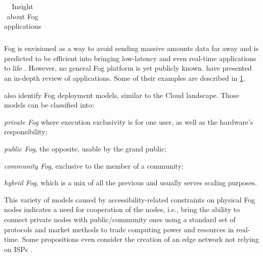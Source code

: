 \documentclass[11pt]{sdm}
\begin{document}
\begin{table}[t]
\begin{tabular}{@{} p{3cm}|p{12cm} @{}}
		\\
		\cmidrule[1pt]{1-2}
	\end{tabular}
	\caption{\label{tab:applications}Insight about Fog applications \cite{ahmed_fog_2019}}
\end{table}

Fog is envisioned as a way to avoid sending massive amounts data far away and is predicted to be efficient into bringing low-latency and even real-time applications to life \cite{ahmed_fog_2019}. However, no general Fog platform is yet publicly known. \citet{ahmed_fog_2019} have presented an in-depth review of applications. Some of their examples are described in \cref{tab:applications}.

\citet{ahmed_fog_2019} also identify Fog deployment models, similar to the Cloud landscape. Those models can be classified into:
\begin{enumerate*}[(a)]
	\item \emph{private Fog} where execution exclusivity is for one user, as well as the hardware's responsibility;
	\item \emph{public Fog}, the opposite, usable by the grand public;
	\item \emph{community Fog}, exclusive to the member of a community;
	\item \emph{hybrid Fog}, which is a mix of all the previous and usually serves scaling purposes.
\end{enumerate*}
This variety of models caused by accessibility-related constraints on physical Fog nodes indicates a need for cooperation of the nodes, i.e., bring the ability to connect private nodes with public/community ones using a standard set of protocols and market methods to trade computing power and resources in real-time. Some propositions even consider the creation of an edge network not relying on \glspl{ISP} \cite{bermbach_towards_2021}.
\end{document}
